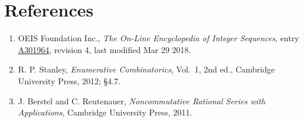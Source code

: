\documentclass[11pt]{article}
\theoremstyle{definition}
\begin{document}
\section{References}

\begin{enumerate}

\item OEIS Foundation Inc., \emph{The On-Line Encyclopedia of Integer Sequences}, entry \href{https://oeis.org/A301964}{A301964}, revision 4, last modified Mar 29 2018.

\item R. P. Stanley, \emph{Enumerative Combinatorics}, Vol.~1, 2nd ed., Cambridge University Press, 2012; \S4.7.

\item J. Berstel and C. Reutenauer, \emph{Noncommutative Rational Series with Applications}, Cambridge University Press, 2011.

\end{enumerate}
\end{document}

